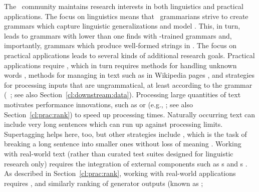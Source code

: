 \documentclass[output=paper,biblatex,babelshorthands,newtxmath,draftmode,colorlinks,citecolor=brown]{langscibook}
\begin{document}
The \delphin\ community maintains research interests in both linguistics and practical
applications. The focus on linguistics means that \delphin\ grammarians strive to create grammars
which capture linguistic generalizations and model . This, in turn, leads
to grammars with lower  than one finds with -trained grammars and,
importantly, grammars which produce well-formed strings in . The focus on
practical applications leads to several kinds of additional research goals. Practical
applications require , which in turn requires methods for handling unknown
words \citep[e.g.,][]{chartmapping}, methods for managing  in text
such as in Wikipedia pages \citep[e.g.,][]{FOY2010a-u}, and strategies for processing inputs that
are ungrammatical, at least according to the grammar (\eg\ \citealp{W11-2923}; see also
Section~\ref{cl:downstream:data}).  Processing large quantities of text motivates performance
innovations, such as  or  (e.g.,
\citealp{matsuzaki2007supertag,dridan2013ubertag}; see also Section~\ref{cl:prac:rank}) to speed up
processing times. Naturally occurring text can include very long sentences which
can run up against processing limits. Supertagging helps here, too, but other strategies include
\textit{}, which is the task of breaking a long sentence into smaller ones
without loss of meaning \citep{muszynska:2016:ACL-SRW}.
Working with real-world text (rather than curated test suites designed for linguistic research only)
requires the integration of external components such as s
\citep[e.g.,][]{Marimon2013a-u} and s
\citep[e.g.,][]{L06-1115,Sch:Usz:Fed:08}. As described in Section~\ref{cl:prac:rank}, working with
real-world applications requires  \citep[e.g.,][]{Tou:Man:Fli:Oep:05}, and
similarly ranking of generator outputs (known as \textit{};
\end{document}
